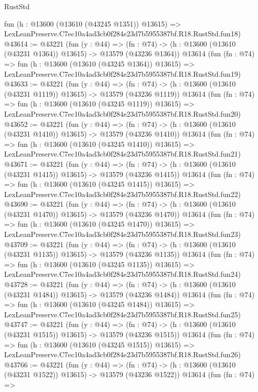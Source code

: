 \begin{lexlean}{RustStd}
\begin{coremodule}
    fun (h : @13600 (@13610 (@43245 @1351)) @13615) =>
    LexLeanPreserve.C7ec10a4ad3cb0f284e23d7b5955387bf.R18.RustStd.fun18)
@43614 := @43221
    (fun (y : @44) =>
    (fn : @74) -> (h : @13600 (@13610 (@43231 @1364)) @13615) -> @13579 (@43236 @1364))
    @13614
    (fun (fn : @74) =>
    fun (h : @13600 (@13610 (@43245 @1364)) @13615) =>
    LexLeanPreserve.C7ec10a4ad3cb0f284e23d7b5955387bf.R18.RustStd.fun19)
@43633 := @43221
    (fun (y : @44) =>
    (fn : @74) -> (h : @13600 (@13610 (@43231 @1119)) @13615) -> @13579 (@43236 @1119))
    @13614
    (fun (fn : @74) =>
    fun (h : @13600 (@13610 (@43245 @1119)) @13615) =>
    LexLeanPreserve.C7ec10a4ad3cb0f284e23d7b5955387bf.R18.RustStd.fun20)
@43652 := @43221
    (fun (y : @44) =>
    (fn : @74) -> (h : @13600 (@13610 (@43231 @1410)) @13615) -> @13579 (@43236 @1410))
    @13614
    (fun (fn : @74) =>
    fun (h : @13600 (@13610 (@43245 @1410)) @13615) =>
    LexLeanPreserve.C7ec10a4ad3cb0f284e23d7b5955387bf.R18.RustStd.fun21)
@43671 := @43221
    (fun (y : @44) =>
    (fn : @74) -> (h : @13600 (@13610 (@43231 @1415)) @13615) -> @13579 (@43236 @1415))
    @13614
    (fun (fn : @74) =>
    fun (h : @13600 (@13610 (@43245 @1415)) @13615) =>
    LexLeanPreserve.C7ec10a4ad3cb0f284e23d7b5955387bf.R18.RustStd.fun22)
@43690 := @43221
    (fun (y : @44) =>
    (fn : @74) -> (h : @13600 (@13610 (@43231 @1470)) @13615) -> @13579 (@43236 @1470))
    @13614
    (fun (fn : @74) =>
    fun (h : @13600 (@13610 (@43245 @1470)) @13615) =>
    LexLeanPreserve.C7ec10a4ad3cb0f284e23d7b5955387bf.R18.RustStd.fun23)
@43709 := @43221
    (fun (y : @44) =>
    (fn : @74) -> (h : @13600 (@13610 (@43231 @1135)) @13615) -> @13579 (@43236 @1135))
    @13614
    (fun (fn : @74) =>
    fun (h : @13600 (@13610 (@43245 @1135)) @13615) =>
    LexLeanPreserve.C7ec10a4ad3cb0f284e23d7b5955387bf.R18.RustStd.fun24)
@43728 := @43221
    (fun (y : @44) =>
    (fn : @74) -> (h : @13600 (@13610 (@43231 @1484)) @13615) -> @13579 (@43236 @1484))
    @13614
    (fun (fn : @74) =>
    fun (h : @13600 (@13610 (@43245 @1484)) @13615) =>
    LexLeanPreserve.C7ec10a4ad3cb0f284e23d7b5955387bf.R18.RustStd.fun25)
@43747 := @43221
    (fun (y : @44) =>
    (fn : @74) -> (h : @13600 (@13610 (@43231 @1515)) @13615) -> @13579 (@43236 @1515))
    @13614
    (fun (fn : @74) =>
    fun (h : @13600 (@13610 (@43245 @1515)) @13615) =>
    LexLeanPreserve.C7ec10a4ad3cb0f284e23d7b5955387bf.R18.RustStd.fun26)
@43766 := @43221
    (fun (y : @44) =>
    (fn : @74) -> (h : @13600 (@13610 (@43231 @1522)) @13615) -> @13579 (@43236 @1522))
    @13614
    (fun (fn : @74) =>

\end{coremodule}
\end{lexlean}
